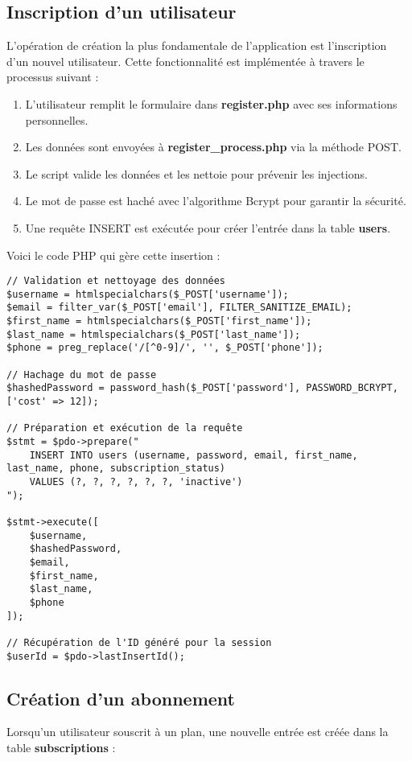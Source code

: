 \documentclass[12pt,a4paper]{report}
\begin{document}
\subsection{Inscription d'un utilisateur}
L'opération de création la plus fondamentale de l'application est l'inscription d'un nouvel utilisateur. Cette fonctionnalité est implémentée à travers le processus suivant :

\begin{enumerate}
    \item L'utilisateur remplit le formulaire dans \textbf{register.php} avec ses informations personnelles.
    \item Les données sont envoyées à \textbf{register\_process.php} via la méthode POST.
    \item Le script valide les données et les nettoie pour prévenir les injections.
    \item Le mot de passe est haché avec l'algorithme Bcrypt pour garantir la sécurité.
    \item Une requête INSERT est exécutée pour créer l'entrée dans la table \textbf{users}.
\end{enumerate}

Voici le code PHP qui gère cette insertion :

\begin{lstlisting}[style=phpStyle, caption=Extrait de register\_process.php - Création d'un utilisateur]
// Validation et nettoyage des données
$username = htmlspecialchars($_POST['username']);
$email = filter_var($_POST['email'], FILTER_SANITIZE_EMAIL);
$first_name = htmlspecialchars($_POST['first_name']);
$last_name = htmlspecialchars($_POST['last_name']);
$phone = preg_replace('/[^0-9]/', '', $_POST['phone']);

// Hachage du mot de passe
$hashedPassword = password_hash($_POST['password'], PASSWORD_BCRYPT, ['cost' => 12]);

// Préparation et exécution de la requête
$stmt = $pdo->prepare("
    INSERT INTO users (username, password, email, first_name, last_name, phone, subscription_status)
    VALUES (?, ?, ?, ?, ?, ?, 'inactive')
");

$stmt->execute([
    $username,
    $hashedPassword,
    $email,
    $first_name,
    $last_name,
    $phone
]);

// Récupération de l'ID généré pour la session
$userId = $pdo->lastInsertId();
\end{lstlisting}

\subsection{Création d'un abonnement}
Lorsqu'un utilisateur souscrit à un plan, une nouvelle entrée est créée dans la table \textbf{subscriptions} :
\end{document}
